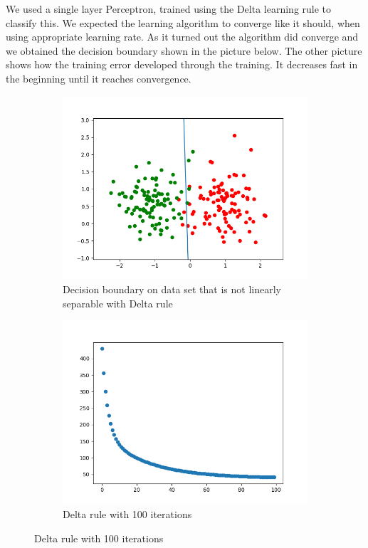 \documentclass[a4paper]{article}
\begin{document}
We used a single layer Perceptron, trained using the Delta learning rule to classify this. We expected the learning algorithm to converge like it should, when using appropriate learning rate. As it turned out the algorithm did converge and we obtained the decision boundary shown in the picture below. The other picture shows how the training error developed through the training. It decreases fast in the beginning until it reaches convergence.
\begin{figure}[htb]
    \centering
    \begin{subfigure}{0.4\textwidth}
        \includegraphics[width=\textwidth]{Labs/Lab 1/Lab 1a/Results/decicion-boundary-not-separable.png}
        \caption{Decision boundary on data set that is not linearly separable with Delta rule}
        \label{fig:Decision-boundary-not-linearly-separable}
    \end{subfigure}
    \hfill
    \begin{subfigure}{0.4\textwidth}
        \includegraphics[width=\textwidth]{Labs/Lab 1/Lab 1a/Results/error-convergance.png}
        \caption{Delta rule with 100 iterations}
        \label{fig:Error-convergance}
    \end{subfigure}
\end{figure}
\end{document}
